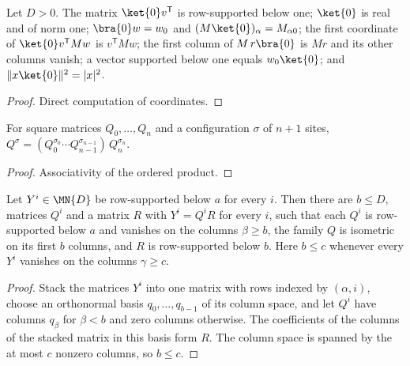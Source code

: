\begin{lemma}
    \label{thm:seqanc_boundary_coords}
    \leanok
    Let $D>0$. The matrix $\ket{0}v^{\mathsf T}$ is row-supported below one;
    $\ket{0}$ is real and of norm one; $\bra{0}w=w_0$ and
    $(M\ket{0})_\alpha=M_{\alpha 0}$; the first coordinate of
    $\ket{0}v^{\mathsf T}Mw$ is $v^{\mathsf T}Mw$; the first column of
    $M\,r\bra{0}$ is $Mr$ and its other columns vanish; a vector supported
    below one equals $w_0\ket{0}$; and $\|x\ket{0}\|^2=|x|^2$.
\end{lemma}
\begin{proof}
    \leanok
    Direct computation of coordinates.
\end{proof}

\begin{lemma}
    \label{thm:seqanc_eval_last}
    \leanok
    For square matrices $Q_0,\dots,Q_n$ and a configuration $\sigma$ of $n+1$
    sites, $Q^\sigma=(Q_0^{\sigma_0}\cdots
        Q_{n-1}^{\sigma_{n-1}})\,Q_n^{\sigma_n}$.
\end{lemma}
\begin{proof}
    \leanok
    Associativity of the ordered product.
\end{proof}

\begin{lemma}
    \label{thm:seqanc_one_step}
    \leanok
    Let $Y^i\in\MN{D}$ be row-supported below $a$ for every $i$. Then there
    are $b\le D$, matrices $Q^i$ and a matrix $R$ with $Y^i=Q^iR$ for every
    $i$, such that each $Q^i$ is row-supported below $a$ and vanishes on the
    columns $\beta\ge b$, the family $Q$ is isometric on its first $b$
    columns, and $R$ is row-supported below $b$. Here $b\le c$ whenever
    every $Y^i$ vanishes on the columns $\gamma\ge c$.
\end{lemma}
\begin{proof}
    \leanok
    Stack the matrices $Y^i$ into one matrix with rows indexed by
    $(\alpha,i)$, choose an orthonormal basis $q_0,\dots,q_{b-1}$ of its
    column space, and let $Q^i$ have columns $q_\beta$ for $\beta<b$ and
    zero columns otherwise. The coefficients of the columns of the stacked
    matrix in this basis form $R$. The column space is spanned by the at most
    $c$ nonzero columns, so $b\le c$.
\end{proof}

